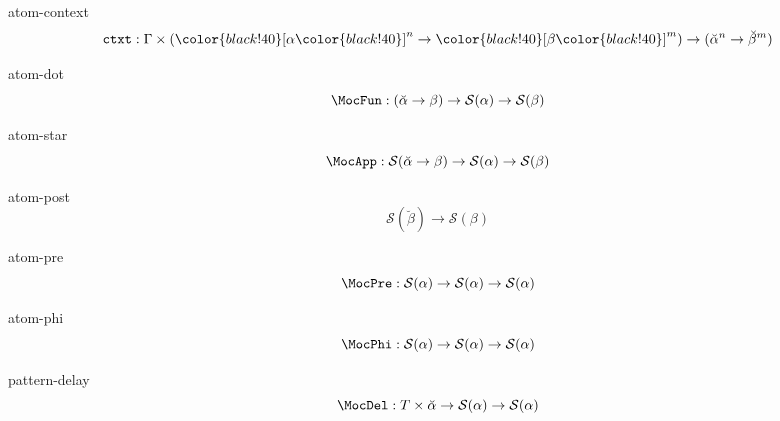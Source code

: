 \documentclass[preview]{standalone}
\begin{document}
\begin{docimage}{atom-context}
  \begin{equation*}%
    \mathtt{ctxt} : \Gamma \times ({\color{black!40}[}\alpha{\color{black!40}]}^n \rightarrow {\color{black!40}[}\beta{\color{black!40}]}^m )
    \rightarrow ({\breve{\alpha}^n \rightarrow \breve{\beta}^m})
  \end{equation*}
\end{docimage} 

\begin{docimage}{atom-dot}
  \begin{equation*}%
    \MocFun :
    ({\breve{\alpha} \rightarrow \beta})
    \rightarrow \mathcal{S}(\alpha) \rightarrow \mathcal{S}(\beta)
  \end{equation*}
\end{docimage} 

\begin{docimage}{atom-star}
  \begin{equation*}%
    \MocApp :
    \mathcal{S}({\breve{\alpha} \rightarrow \beta})
    \rightarrow \mathcal{S}(\alpha) \rightarrow \mathcal{S}(\beta)
  \end{equation*}
\end{docimage}

\begin{docimage}{atom-post}
  \begin{equation*}%
    \mathcal{S}({\breve{\beta}})
    \rightarrow \mathcal{S}(\beta)
  \end{equation*}
\end{docimage}

\begin{docimage}{atom-pre}
  \begin{equation*}%
    \MocPre : \mathcal{S}(\alpha) 
    \rightarrow \mathcal{S}(\alpha) \rightarrow \mathcal{S}(\alpha)
  \end{equation*}
\end{docimage}

\begin{docimage}{atom-phi}
  \begin{equation*}%
    \MocPhi :
    \mathcal{S}(\alpha)
    \rightarrow \mathcal{S}(\alpha) \rightarrow \mathcal{S}(\alpha)
  \end{equation*}
\end{docimage}


\begin{docimage}{pattern-delay}
  \begin{equation*}%
    \MocDel :
    T \times \breve{\alpha}
    \rightarrow \mathcal{S}(\alpha) \rightarrow \mathcal{S}(\alpha)
  \end{equation*}
\end{docimage}
\end{document}
